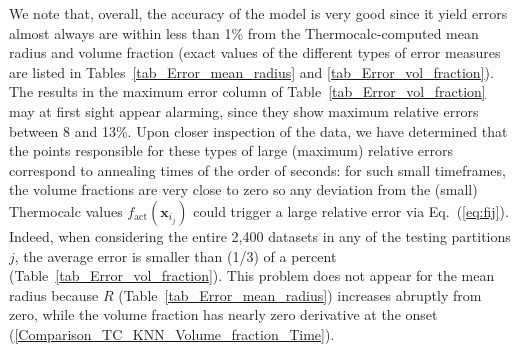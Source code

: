 We note that, overall, the accuracy of the model is very good since it yield errors almost always are within less than
1\% from the Thermocalc-computed mean radius and volume fraction
(exact values of the different types of error measures are listed in
Tables~\ref{tab_Error_mean_radius} and \ref{tab_Error_vol_fraction}). The results in the maximum error column of
Table~\ref{tab_Error_vol_fraction} may at first sight appear alarming, since they
show maximum relative errors between 8 and 13\%. Upon closer inspection of the data,
we have determined that the points responsible for these types of large (maximum) relative
errors correspond to annealing times of the order of seconds: for such small timeframes, the volume fractions
are very close to zero so any deviation from the (small) Thermocalc values $f_{\text {act}} (\textbf{x}_{i_j}) $
could trigger a large  relative error via Eq.~({\ref{eq:fij}}).
Indeed, when considering the entire 2,400 datasets in any of the testing partitions $j$,
the average error is smaller than (1/3) of a percent (Table~\ref{tab_Error_vol_fraction}).
This problem does not appear for the mean radius because $R$ (Table~\ref{tab_Error_mean_radius})
increases abruptly from zero, while the volume fraction has
nearly zero derivative at the onset (\ref{Comparison_TC_KNN_Volume_fraction_Time}).



